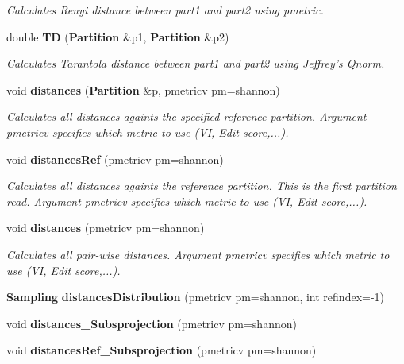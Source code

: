 \begin{CompactItemize}
\begin{CompactList}\small\item\em Calculates Renyi distance between part1 and part2 using pmetric. \item\end{CompactList}\item 
double {\bf TD} ({\bf Partition} \&p1, {\bf Partition} \&p2)\label{classPartitionStats_a37}

\begin{CompactList}\small\item\em Calculates Tarantola distance between part1 and part2 using Jeffrey's Qnorm. \item\end{CompactList}\item 
void {\bf distances} ({\bf Partition} \&p, pmetricv pm=shannon)\label{classPartitionStats_a38}

\begin{CompactList}\small\item\em Calculates all distances againts the specified reference partition. Argument pmetricv specifies which metric to use (VI, Edit score,...). \item\end{CompactList}\item 
void {\bf distances\-Ref} (pmetricv pm=shannon)\label{classPartitionStats_a39}

\begin{CompactList}\small\item\em Calculates all distances againts the reference partition. This is the first partition read. Argument pmetricv specifies which metric to use (VI, Edit score,...). \item\end{CompactList}\item 
void {\bf distances} (pmetricv pm=shannon)\label{classPartitionStats_a40}

\begin{CompactList}\small\item\em Calculates all pair-wise distances. Argument pmetricv specifies which metric to use (VI, Edit score,...). \item\end{CompactList}\item 
{\bf Sampling} {\bf distances\-Distribution} (pmetricv pm=shannon, int refindex=-1)
\item 
void {\bf distances\_\-Subsprojection} (pmetricv pm=shannon)
\item 
void {\bf distances\-Ref\_\-Subsprojection} (pmetricv pm=shannon)\label{classPartitionStats_a43}


\end{CompactItemize}

